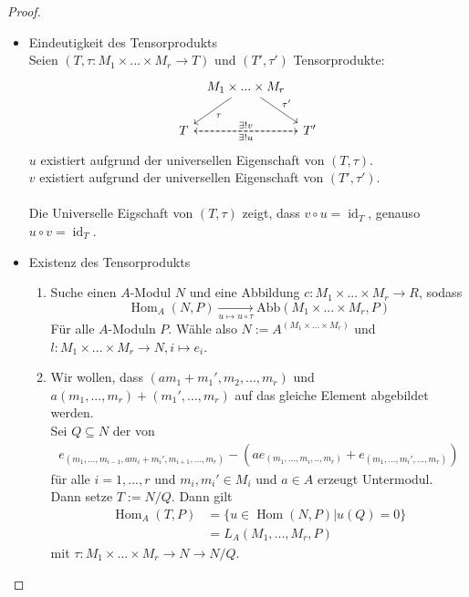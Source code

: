 \documentclass[10pt,a4paper]{article}
\newcommand{\Hom}{\operatorname{Hom}}
\newcommand{\id}{\operatorname{id}}
\theoremstyle{definition}
\theoremstyle{plain}
\theoremstyle{remark}
\begin{document}
\begin{proof}
	\begin{itemize}
		\item Eindeutigkeit des Tensorprodukts\\
		Seien $(T,\tau:M_1\times...\times M_r\rightarrow T)$ und $(T',\tau')$ Tensorprodukte:
		\[\begin{tikzcd}[column sep=tiny]
			&M_1\times...\times M_r \ar{ld}{\tau} \ar{dr}{\tau'}&\\
			T \ar[rr,dashed,"\exists!v"] &&T' \ar[ll,dashed,"\exists!u"]
		\end{tikzcd}\]
		$u$ existiert aufgrund der universellen Eigenschaft von $(T,\tau)$.\\
		$v$ existiert aufgrund der universellen Eigenschaft von $(T',\tau')$.\\
		\\
		Die Universelle Eigschaft von $(T,\tau)$ zeigt, dass $v\circ u=\id_T$, genauso $u\circ v=\id_T$.
		\item Existenz des Tensorprodukts\\
		\begin{enumerate}
			\item Suche einen $A$-Modul $N$ und eine Abbildung $c:M_1\times...\times M_r\rightarrow R$, sodass
			\[\Hom_A(N,P)\xrightarrow[u\mapsto u\circ\tau]{ }\text{Abb}(M_1\times...\times M_r,P)\]
			Für alle $A$-Moduln $P$. Wähle also $N:=A^{(M_1\times...\times M_r)}$ und\\ $l:M_1\times...\times M_r \to N,i\mapsto e_i$.
				
			\item Wir wollen, dass $(am_1+m_1',m_2,...,m_r)$ und $a(m_1,...,m_r)+(m_1',...,m_r)$ auf das gleiche Element abgebildet werden.\\
			Sei $Q\subseteq N$ der von
			\begin{align*}
			e_{(m_1,...,m_{i-1},am_i+m_i',m_{i+1},...,m_r)}-\left(ae_{(m_1,...,m_i,..,m_r)}+e_{(m_1,...,m_i',...,m_r)}\right)
			\end{align*}
			für alle $i=1,...,r$ und $m_i,m_i'\in M_i$ und $a\in A$ erzeugt Untermodul.\\
			Dann setze $T:=N/Q$. Dann gilt
			\begin{align*}
			\Hom_A(T,P)&=\{u\in \Hom(N,P)|u(Q)=0\}\\
			&=L_A(M_1,...,M_r,P)
			\end{align*}
			mit $\tau:M_1\times...\times M_r\rightarrow N\rightarrow N/Q$.
		\end{enumerate}
	\end{itemize}
\end{proof}
\end{document}
